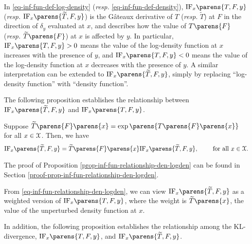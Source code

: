 In \eqref{eq-inf-fun-def-log-density} (\textit{resp.} \eqref{eq-inf-fun-def-density}), $\mathrm{IF}_x \parens{T, F, y}$ (\textit{resp.} $\mathrm{IF}_x \parens{\widetilde{T}, F, y}$) is the G{\^a}teaux derivative of $T$ (\textit{resp.} $\widetilde{T}$) at $F$ in the direction of $\delta_y$ evaluated at $x$, and describes how the value of $T \parens{F}$ (\textit{resp.} $\widetilde{T} \parens{F}$) at $x$ is affected by $y$. 
In particular, $\mathrm{IF}_x \parens{T, F, y} > 0$ means the value of the log-density function at $x$ increases with the presence of $y$, and $\mathrm{IF}_x \parens{T, F, y} < 0$ means the value of the log-density function at $x$ decreases with the presence of $y$. A similar interpretation can be extended to $\mathrm{IF}_x \parens{\widetilde{T}, F, y}$, simply by replacing ``log-density function'' with ``density function''. 

The following proposition establishes the relationship between $\mathrm{IF}_x \parens{\widetilde{T}, F, y}$ and $\mathrm{IF}_x \parens{T, F, y}$. 

\begin{proposition}\label{prop-inf-fun-relationship-den-logden}
	Suppose $\widetilde{T} \parens{F} \parens{x} = \exp \parens{T \parens{F} \parens{x}}$ for all $x \in \mathcal{X}$. Then, we have 
	\begin{align}\label{eq-inf-fun-relationship-den-logden}
		\mathrm{IF}_x \parens{\widetilde{T}, F, y} = \widetilde{T} \parens{F} \parens{x} \mathrm{IF}_x \parens{\widetilde{T}, F, y}, \qquad \text{ for all } x \in \calX. 
	\end{align}
\end{proposition}

The proof of Proposition \ref{prop-inf-fun-relationship-den-logden} can be found in Section \ref{proof-prop-inf-fun-relationship-den-logden}. 

From \eqref{eq-inf-fun-relationship-den-logden}, we can view $\mathrm{IF}_x \parens{\widetilde{T}, F, y}$ as a weighted version of $\mathrm{IF}_x \parens{T, F, y}$, where the weight is $\widetilde{T} \parens{x}$, the value of the unperturbed density function at $x$. 

In addition, the following proposition establishes the relationship among the KL-divergence, $\mathrm{IF}_x \parens{T, F, y}$, and $\mathrm{IF}_x \parens{\widetilde{T}, F, y}$. 

